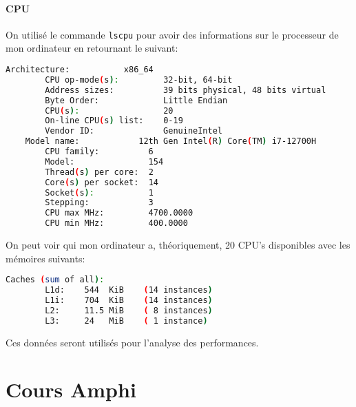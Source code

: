 \documentclass{article}
\begin{document}
\paragraph{CPU}On utilisé le commande \texttt{lscpu} pour avoir des informations sur le processeur de mon ordinateur en retournant le suivant:
\begin{scriptsize}
    \mycode
    \begin{lstlisting}[language=bash]
    Architecture:           x86_64
        CPU op-mode(s):         32-bit, 64-bit
        Address sizes:          39 bits physical, 48 bits virtual
        Byte Order:             Little Endian
        CPU(s):                 20
        On-line CPU(s) list:    0-19
        Vendor ID:              GenuineIntel
    Model name:            12th Gen Intel(R) Core(TM) i7-12700H
        CPU family:          6
        Model:               154
        Thread(s) per core:  2
        Core(s) per socket:  14
        Socket(s):           1
        Stepping:            3
        CPU max MHz:         4700.0000
        CPU min MHz:         400.0000
    \end{lstlisting}
\end{scriptsize}
On peut voir qui mon ordinateur a, théoriquement, 20 CPU's disponibles avec les mémoires suivants:
\begin{scriptsize}
    \mycode
    \begin{lstlisting}[language=bash]
    Caches (sum of all):     
        L1d:    544  KiB    (14 instances)
        L1i:    704  KiB    (14 instances)
        L2:     11.5 MiB    ( 8 instances)
        L3:     24   MiB    ( 1 instance)
    \end{lstlisting}
\end{scriptsize}
Ces données seront utilisés pour l'analyse des performances.


\section{Cours Amphi}
\begin{resolution}

\end{resolution}
\end{document}

